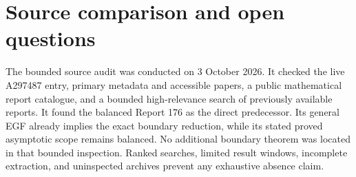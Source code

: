 \documentclass[11pt,letterpaper]{article}
\theoremstyle{remark}\newtheorem{remark}[theorem]{Remark}
\begin{document}
\section{Source comparison and open questions}\label{tmm:bd:sec:sources}
The bounded source audit was conducted on 3 October 2026. It checked the live A297487 entry, primary metadata and accessible papers, a public mathematical report catalogue, and a bounded high-relevance search of previously available reports. It found the balanced Report 176 as the direct predecessor. Its general EGF already implies the exact boundary reduction, while its stated proved asymptotic scope remains balanced. No additional boundary theorem was located in that bounded inspection. Ranked searches, limited result windows, incomplete extraction, and uninspected archives prevent any exhaustive absence claim.
\end{document}
